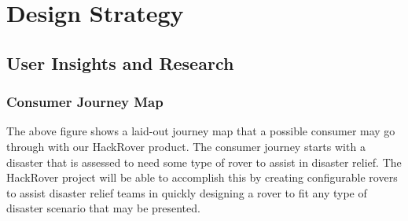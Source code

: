 \documentclass[a4paper, 10pt]{article}
\begin{document}
\begin{titlepage}
\end{titlepage}

\pagebreak{}

\tableofcontents

\pagebreak{}

\section{Design Strategy}
	
	\subsection{User Insights and Research} 
		\subsubsection{Consumer Journey Map}
			The above figure shows a laid-out journey map that a possible consumer may go through with our HackRover product. The consumer journey starts with a disaster that is assessed to need some type of rover to assist in disaster relief. The HackRover project will be able to accomplish this by creating configurable rovers to assist disaster relief teams in quickly designing a rover to fit any type of disaster scenario that may be presented.
\end{document}
